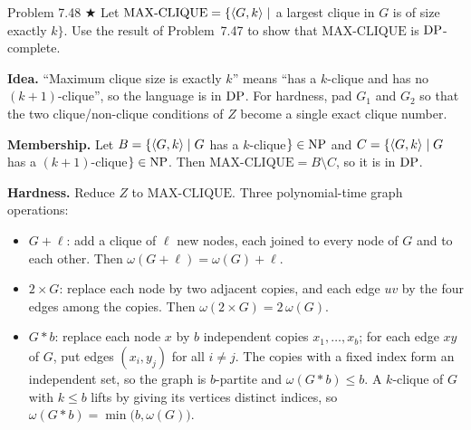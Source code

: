 \begin{question}{Problem 7.48 $\bigstar$}
Let $\mathrm{MAX\text{-}CLIQUE}=\{\langle G,k\rangle\mid$ a largest clique in $G$ is of size exactly $k\}$. Use the result of Problem~7.47 to show that $\mathrm{MAX\text{-}CLIQUE}$ is $\mathrm{DP}$-complete.
\end{question}
\begin{soln}
\textbf{Idea.} ``Maximum clique size is exactly $k$'' means ``has a $k$-clique and has no $(k+1)$-clique'', so the language is in $\mathrm{DP}$. For hardness, pad $G_1$ and $G_2$ so that the two clique/non-clique conditions of $Z$ become a single exact clique number.

\textbf{Membership.}
Let $B=\{\langle G,k\rangle\mid G$ has a $k$-clique$\}\in\mathrm{NP}$ and $C=\{\langle G,k\rangle\mid G$ has a $(k+1)$-clique$\}\in\mathrm{NP}$. Then $\mathrm{MAX\text{-}CLIQUE}=B\setminus C$, so it is in $\mathrm{DP}$.

\textbf{Hardness.}
Reduce $Z$ to $\mathrm{MAX\text{-}CLIQUE}$. Three polynomial-time graph operations:
\begin{itemize}
\item $G+\ell$: add a clique of $\ell$ new nodes, each joined to every node of $G$ and to each other. Then $\omega(G+\ell)=\omega(G)+\ell$.
\item $2\times G$: replace each node by two adjacent copies, and each edge $uv$ by the four edges among the copies. Then $\omega(2\times G)=2\,\omega(G)$.
\item $G*b$: replace each node $x$ by $b$ independent copies $x_1,\ldots,x_b$; for each edge $xy$ of $G$, put edges $(x_i,y_j)$ for all $i\neq j$. The copies with a fixed index form an independent set, so the graph is $b$-partite and $\omega(G*b)\le b$. A $k$-clique of $G$ with $k\le b$ lifts by giving its vertices distinct indices, so $\omega(G*b)=\min\bigl(b,\omega(G)\bigr)$.
\end{itemize}


\end{soln}
